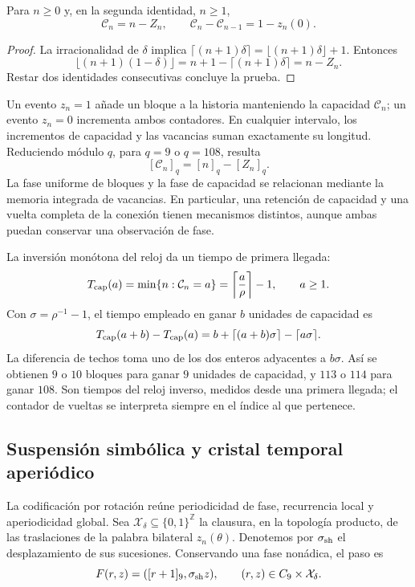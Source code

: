 \begin{proposition}
\label{mono-ampl:balance-capacidad}
Para \(n\geq0\) y, en la segunda identidad, \(n\geq1\),
\[
 \mathcal C_n=n-Z_n,\qquad
 \mathcal C_n-\mathcal C_{n-1}=1-z_n(0).
\]
\end{proposition}
\begin{proof}
La irracionalidad de \(\delta\) implica
\(\lceil(n+1)\delta\rceil=\lfloor(n+1)\delta\rfloor+1\).
Entonces
\[
 \lfloor(n+1)(1-\delta)\rfloor
 =n+1-\lceil(n+1)\delta\rceil=n-Z_n.
\]
Restar dos identidades consecutivas concluye la prueba.
\end{proof}

Un evento \(z_n=1\) añade un bloque a la historia manteniendo la capacidad
\(\mathcal C_n\); un evento \(z_n=0\) incrementa ambos contadores. En
cualquier intervalo, los incrementos de capacidad y las vacancias suman
exactamente su longitud. Reduciendo módulo \(q\), para \(q=9\) o
\(q=108\), resulta
\[
 [\mathcal C_n]_q=[n]_q-[Z_n]_q.
\]
La fase uniforme de bloques y la fase de capacidad se relacionan mediante
la memoria integrada de vacancias. En particular, una retención de
capacidad y una vuelta completa de la conexión tienen mecanismos
distintos, aunque ambas puedan conservar una observación de fase.

La inversión monótona del reloj da un tiempo de primera llegada:
\[
 T_{\rm cap}(a)=\min\{n:\mathcal C_n=a\}
 =\left\lceil\frac a\rho\right\rceil-1,
 \qquad a\geq1.
\]
Con \(\sigma=\rho^{-1}-1\), el tiempo empleado en ganar \(b\) unidades
de capacidad es
\[
 T_{\rm cap}(a+b)-T_{\rm cap}(a)
 =b+\lceil(a+b)\sigma\rceil-\lceil a\sigma\rceil.
\]
La diferencia de techos toma uno de los dos enteros adyacentes a
\(b\sigma\). Así se obtienen \(9\) o \(10\) bloques para ganar
\(9\) unidades de capacidad, y \(113\) o \(114\) para ganar \(108\).
Son tiempos del reloj inverso, medidos desde una primera llegada; el
contador de vueltas se interpreta siempre en el índice al que pertenece.

\subsection{Suspensión simbólica y cristal temporal aperiódico}
\label{mono-ampl:cristal}

La codificación por rotación reúne periodicidad de fase, recurrencia local
y aperiodicidad global. Sea \(\mathcal X_\delta\subseteq\{0,1\}^{\mathbb Z}\)
la clausura, en la topología producto, de las traslaciones de la palabra
bilateral \(z_n(\theta)\). Denotemos por \(\sigma_{\rm sh}\) el
desplazamiento de sus sucesiones. Conservando una fase nonádica, el paso es
\[
 F(r,z)=([r+1]_9,\sigma_{\rm sh}z),\qquad
 (r,z)\in C_9\times\mathcal X_\delta.
\]

